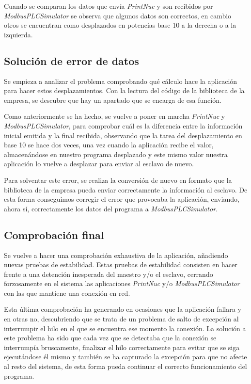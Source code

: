 \documentclass[pdftex,11pt,a4paper]{book}
\begin{document}
Cuando se comparan los datos que envía \emph{PrintNuc} y son recibidos por \emph{ModbusPLCSimulator} se observa que algunos datos son correctos, en cambio otros se encuentran como desplazados en potencias base 10 a la derecha o a la izquierda.

\subsection{Solución de error de datos}

Se empieza a analizar el problema comprobando qué cálculo hace la aplicación para hacer estos desplazamientos. Con la lectura del código de  la biblioteca de la empresa, se descubre que hay un apartado que se encarga de esa función.

Como anteriormente se ha hecho, se vuelve a poner en marcha \emph{PrintNuc} y \emph{ModbusPLCSimulator}, para comprobar cuál es la diferencia entre la información inicial emitida y la final recibida, observando que la tarea del desplazamiento en base 10 se hace dos veces, una vez cuando la aplicación recibe el valor, almacenándose en nuestro programa desplazado y este mismo valor nuestra aplicación lo vuelve a desplazar para enviar al esclavo de nuevo.

Para solventar este error, se realiza la conversión de nuevo en formato que la biblioteca de la empresa pueda enviar correctamente la información al esclavo. De esta forma conseguimos corregir el error que provocaba la aplicación, enviando, ahora sí, correctamente los datos del programa a \emph{ModbusPLCSimulator}.

\subsection{Comprobación final}

Se vuelve a hacer una comprobación exhaustiva de la aplicación, añadiendo nuevas pruebas de estabilidad. Estas pruebas de estabilidad consisten en hacer frente a una detención inesperada del maestro y/o el esclavo, cerrando forzosamente en el sistema las aplicaciones \emph{PrintNuc} y/o \emph{ModbusPLCSimulator} con las que mantiene una conexión en red.

Esta última comprobación ha generando en ocasiones que la aplicación fallara y en otras no, descubriendo que se trata de un problema de salto de excepción al interrumpir el hilo en el que se encuentra ese momento la conexión. La solución a este problema ha sido que cada vez que se detectaba que la conexión se interrumpía bruscamente, finalizar el hilo correctamente para evitar que se siga ejecutándose él mismo y también se ha capturado la excepción para que no afecte al resto del sistema, de esta forma pueda continuar el correcto funcionamiento del programa.
\end{document}
